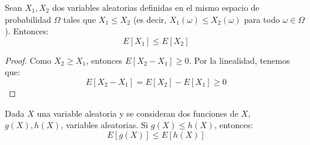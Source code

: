 \begin{coro}
    Sean $X_1,X_2$ dos variables aleatorias definidas en el mismo espacio de probabilidad $\Omega$ tales que $X_1\leq X_2$ (es decir, $X_1(\omega)\leq X_2(\omega)$ para todo $\omega\in \Omega$).
    Entonces:
    \begin{equation*}
        E[X_1]\leq E[X_2]
    \end{equation*}
\end{coro}
\begin{proof}
    Como $X_2\geq X_1$, entonces $E[X_2-X_1]\geq 0$. Por la linealidad, tenemos que:
    \begin{equation*}
        E[X_2-X_1] = E[X_2]-E[X_1]\geq 0
    \end{equation*}
\end{proof}

\begin{prop}
    Dada $X$ una variable aleatoria y se consideran dos funciones de $X$, $g(X), h(X)$, variables aleatorias. Si $g(X)\leq h(X)$, entonces:
    \begin{equation*}
        E[g(X)]\leq E[h(X)]
    \end{equation*}
\end{prop}
